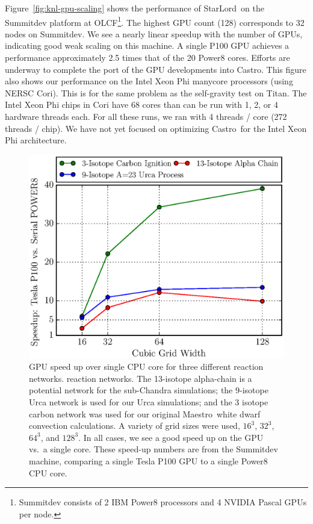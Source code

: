\documentclass[a4paper]{jpconf}
\newcommand{\maestro}{{\sffamily Maestro}}
\newcommand{\castro}{{\sffamily Castro}}
\newcommand{\starlord}{{\sffamily StarLord}}
\begin{document}
Figure~\ref{fig:knl-gpu-scaling} shows the performance of
\starlord\ on the Summitdev platform at OLCF\footnote{Summitdev
  consists of 2 IBM Power8 processors and 4 NVIDIA Pascal GPUs per
  node.}.  The highest GPU count (128) corresponds to 32 nodes on
Summitdev.  We see a nearly linear speedup with the number of GPUs,
indicating good weak scaling on this machine. A single P100 GPU achieves
a performance approximately 2.5 times that of the 20 Power8 cores. Efforts are underway to
complete the port of the GPU developments into \castro.  This figure
also shows our performance on the Intel Xeon Phi manycore processors (using
NERSC Cori).  This is for the same problem as the self-gravity test on
Titan.  The Intel Xeon Phi chips in Cori
have 68 cores than can be run with 1, 2, or 4 hardware threads each.
For all these runs, we ran with 4 threads / core (272
threads / chip).  We have not yet focused on optimizing \castro\ for the
Intel Xeon Phi architecture.

\begin{figure}[t]
\centering
\includegraphics[width=0.48\linewidth]{cuda-vode-speedup}
\begin{minipage}[b]{0.48\linewidth}
\caption{\label{fig:cudaode} GPU speed up over single CPU core for three
  different reaction networks.
  reaction networks.  The 13-isotope alpha-chain is a
  potential network for the sub-Chandra simulations;
  the 9-isotope Urca network is used for our Urca simulations;
  and the 3 isotope carbon network was used for our original \maestro\
  white dwarf convection calculations.  A
  variety of grid sizes were used, $16^3$, $32^3$, $64^3$, and
  $128^3$.  In all cases, we see a good  speed up on the GPU
  vs.\ a single core.  These speed-up numbers are from the
  Summitdev machine, comparing a single Tesla P100 GPU to a single Power8 CPU core.}
\end{minipage}
\end{figure}
\end{document}
